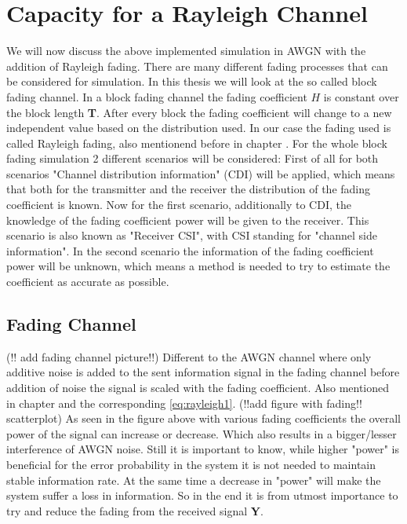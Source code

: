 \chapter{Capacity for a Rayleigh Channel} 
\label{chap:raychan}
\graphicspath{{C:/Users/Kevin/Bachelarbeit/Bachelorarbeit/01_Bachelorarbeit_LaTex/02_Figures/}}


We will now discuss the above implemented simulation in AWGN with the addition of Rayleigh fading. 
There are many different fading processes that can be considered for simulation. In this thesis we will look at the so called block fading channel. In a block fading channel the fading coefficient $H$ is constant over the block length \textbf{T}. After every block the fading coefficient will change to a new independent value based on the distribution used.
In our case the fading used is called Rayleigh fading, also mentionend before in chapter . For the whole block fading simulation 2 different scenarios will be considered:
\newline
First of all for both scenarios "Channel distribution information" (CDI) will be applied, which means that both for the transmitter and the receiver the distribution of the fading coefficient is known. Now for the first scenario, additionally to CDI, the knowledge of the fading coefficient power will be given to the receiver. This scenario is also known as "Receiver CSI", with CSI standing for "channel side information".
\newline
In the second scenario the information of the fading coefficient power will be unknown, which means a method is needed to try to estimate the coefficient as accurate as possible.  

\section{Fading Channel}
(!! add fading channel picture!!)
Different to the \gls{AWGN} channel where only additive noise is added to the sent information signal in the fading channel before addition of noise the signal is scaled with the fading coefficient. Also mentioned in chapter  and the corresponding \eqref{eq:rayleigh1}.
(!!add figure with fading!! scatterplot)
As seen in the figure above with various fading coefficients the overall power of the signal can increase or decrease. Which also results in a bigger/lesser interference of AWGN noise. Still it is important to know, while higher "power" is beneficial for the error probability in the system it is not needed to maintain stable information rate. At the same time a decrease in "power" will make the system suffer a loss in information. So in the end it is from utmost importance to try and reduce the fading from the received signal \textbf{Y}.
